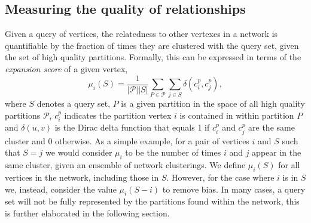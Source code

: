 \documentclass[sigconf]{acmart}
\begin{document}
\subsection{Measuring the quality of relationships} \label{sec:expansion}
Given a query of vertices, the relatedness to other vertexes in a network is quantifiable by the fraction of times they are clustered with the query set, given the set of high quality partitions.
Formally, this can be expressed in terms of the \textit{expansion score} of a given vertex,
\begin{equation} \label{eq:mu_score}
\mu_i(S) = \frac{1}{|\mathcal{P}| |S| } \sum_{P \in \mathcal{P}} \sum_{j \in S} \delta(c^{p}_i, c^{p}_j),
\end{equation}
where $S$ denotes a query set, $P$ is a given partition in the space of all high quality partitions $\mathcal{P}$, $c^{p}_{i}$ indicates the partition vertex $i$ is contained in within partition $P$ and
$\delta(u, v)$ is the Dirac delta function that equals 1 if $c^{p}_i$ and  $c^{p}_j$ are the same cluster and $0$ otherwise.
As a simple example, for a pair of vertices $i$ and $S$ such that $S = {j}$ we would consider $\mu_i$ to be the number of times $i$ and $j$ appear in the same cluster, given an ensemble of network clusterings.
We define $\mu_i(S)$ for all vertices in the network, including those in $S$.
However, for the case where $i$ is in $S$ we, instead, consider the value $\mu_i(S - i)$ to remove bias.
In many cases, a query set will not be fully represented by the partitions found within the network, this is further elaborated in the following section.
\end{document}
